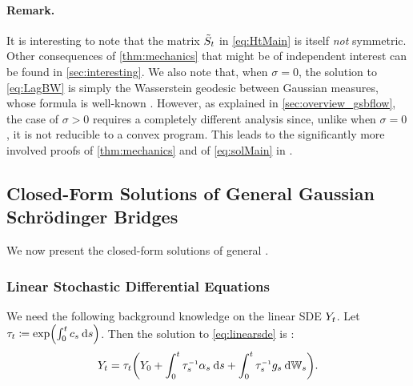 \paragraph{Remark.}
It is interesting to note that the matrix $\tilde{S}_{t}$ in \eqref{eq:HtMain} is itself \emph{not} symmetric. Other consequences of \cref{thm:mechanics} that might be of independent interest can be found in \cref{sec:interesting}. We also note that, when $\sigma = 0$, the solution to \eqref{eq:LagBW} is simply the Wasserstein geodesic between Gaussian measures, whose formula is well-known \citep{dowson1982frechet, takatsu2010wasserstein}. However, as explained in \cref{sec:overview_gsbflow}, the case of $\sigma > 0$ requires a completely different analysis since, unlike when $\sigma = 0$, it is not reducible to a convex program. This leads to the significantly more involved proofs of \cref{thm:mechanics} and of \eqref{eq:solMain} in \citet{mallasto2021entropy}.


\subsection{Closed-Form Solutions of General Gaussian Schr\"odinger Bridges}
\label{sec:results_gsbflow}

We now present the closed-form solutions of general .

\subsubsection{Linear Stochastic Differential Equations}
\label{sec:linearsdes}

We need the following background knowledge on the linear \acrshort{SDE} $Y_{ t }$. Let $\aggtime \defeq \exp\parens*{  \int_0^\ctime \drift[\ctimealt] \dd \ctimealt}$. Then the solution to \eqref{eq:linearsde} is \citep{platen2010numerical}:
\begin{align}
\label{eq:linearsdesol}
\refsde = \aggtime  \parens*{\refsde[0] +  \int_0^\ctime  \aggtimeinv[\ctimealt]\shift[\ctimealt]  \dd \ctimealt + \int_0^\ctime {\aggtimeinv[\ctimealt]}{ \volat[\ctimealt] } \dWiener }.
\end{align}

